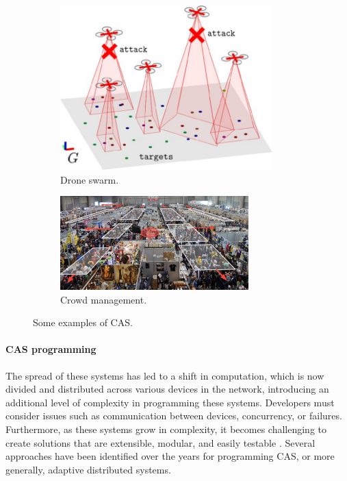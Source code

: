 \documentclass[12pt,a4paper,openright,twoside]{book}
\begin{document}
\begin{figure}[h]
  \centering
  \begin{subfigure}[b]{0.49\textwidth}
    \centering
    \includegraphics[width=0.9\textwidth]{figures/swarm2.jpeg}
    \caption{Drone swarm.}
    \label{fig:cas-examples-drone}
  \end{subfigure}

  \begin{subfigure}[b]{0.49\textwidth}
    \centering
    \includegraphics[width=0.8\textwidth]{figures/crowd.png}
    \caption{Crowd management.}
    \label{fig:cas-examples-crowd}
  \end{subfigure}
  \caption{Some examples of CAS.}
\end{figure}

\paragraph*{CAS programming}
The spread of these systems has led to a shift in computation, which is now divided and distributed across various devices in the network, introducing an additional level of complexity in programming these systems.
Developers must consider issues such as communication between devices, concurrency, or failures. 
Furthermore, as these systems grow in complexity, it becomes challenging to create solutions that are extensible, modular, and easily testable \cite{DBLP:conf/ecoop/CasadeiV16}.
Several approaches have been identified over the years for programming \ac*{CAS}, or more generally, adaptive distributed systems. \\
\end{document}
